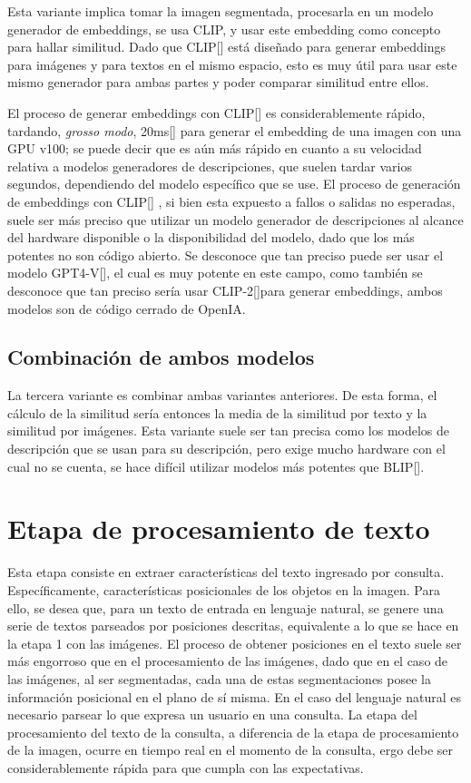 Esta variante implica tomar la imagen segmentada, procesarla en un modelo generador de embeddings, se usa CLIP, y usar este embedding como concepto para hallar similitud. Dado que CLIP[\cite{clip}] está diseñado para generar embeddings para imágenes y para textos en el mismo espacio, esto es muy útil para usar este mismo generador para ambas partes y poder comparar similitud entre ellos.

El proceso de generar embeddings con CLIP[\cite{clip}] es considerablemente rápido, tardando, \textit{grosso modo}, 20ms[\cite{BuildingImageClip-20ms}] para generar el embedding de una imagen con una GPU v100; se puede decir que es aún más rápido en cuanto a su velocidad relativa a modelos generadores de descripciones, que suelen tardar varios segundos, dependiendo del modelo específico que se use. El proceso de generación de embeddings con CLIP[\cite{clip}] , si bien esta expuesto a fallos o salidas no esperadas, suele ser más preciso que utilizar un modelo generador de descripciones al alcance del hardware disponible o la disponibilidad del modelo, dado que los más potentes no son código abierto. Se desconoce que tan preciso puede ser usar el modelo GPT4-V[\cite{gpt-4v}], el cual es muy potente en este campo, como también se desconoce que tan preciso sería usar CLIP-2[\cite{clip2-paper}]para generar embeddings, ambos modelos son de código cerrado de OpenIA.

\subsection{Combinaci\'on de ambos modelos}
La tercera variante es combinar ambas variantes anteriores. De esta forma, el cálculo de la similitud sería entonces la media de la similitud por texto y la similitud por imágenes. Esta variante suele ser tan precisa como los modelos de descripción que se usan para su descripción, pero exige mucho hardware con el cual no se cuenta, se hace dif\'icil utilizar modelos más potentes que BLIP[\cite{blip}].

\section{Etapa de procesamiento de texto}

Esta etapa consiste en extraer características del texto ingresado por consulta. Específicamente, características posicionales de los objetos en la imagen. Para ello, se desea que, para un texto de entrada en lenguaje natural, se genere una serie de textos parseados por posiciones descritas, equivalente a lo que se hace en la etapa 1 con las imágenes. El proceso de obtener posiciones en el texto suele ser más engorroso que en el procesamiento de las imágenes, dado que en el caso de las imágenes, al ser segmentadas, cada una de estas segmentaciones posee la información posicional en el plano de sí misma. En el caso del lenguaje natural es necesario parsear lo que expresa un usuario en una consulta. La etapa del procesamiento del texto de la consulta, a diferencia de la etapa de procesamiento de la imagen, ocurre en tiempo real en el momento de la consulta, ergo debe ser considerablemente rápida para que cumpla con las expectativas.

